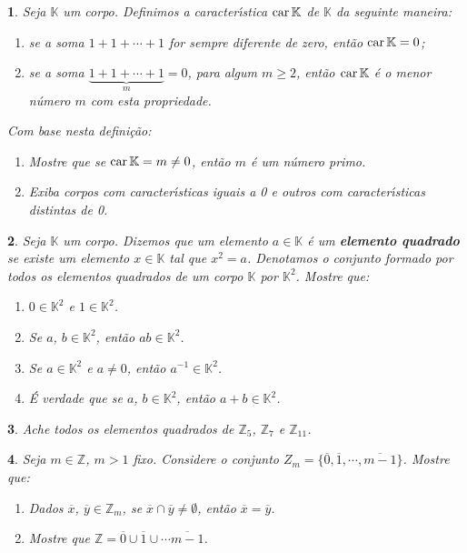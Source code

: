 \documentclass[12pt]{exam}
\newtheorem{exercicio}{}
\newcommand{\z}{\mathbb{Z}}
\newcommand{\cp}[1]{\mathbb{#1}}
\newcommand{\ch}{\mbox{\textrm{car\,}}\nobreak}
\begin{document}
\begin{exercicio}
Seja $\cp{K}$ um corpo. Definimos a caracter{\'\i}stica \textbf{$\ch \cp{K}$} de $\cp{K}$ da seguinte maneira:
\begin{enumerate}[label=({\roman*})]
  \item se a soma $1 + 1 + \cdots + 1$ for sempre diferente de zero, ent\~ao \textbf{$\ch \cp{K} = 0$};
  \item se a soma $\underbrace{1 + 1 + \cdots + 1}_{m} = 0$, para algum $m \ge 2$, ent\~ao \textbf{$\ch \cp{K}$} \'e o menor n\'umero $m$ com esta propriedade.
\end{enumerate}
Com base nesta defini\c{c}\~ao:
\begin{enumerate}[label={\alph*})]
  \item Mostre que se $\ch \cp{K} = m \ne 0$, ent\~ao $m$ \'e um n\'umero primo.
  \item Exiba corpos com caracter{\'\i}sticas iguais a 0 e outros com caracter{\'\i}sticas distintas de 0.
\end{enumerate}
\end{exercicio}

\begin{exercicio}
  Seja $\cp{K}$ um corpo. Dizemos que um elemento $a \in \cp{K}$ \'e um \textbf{elemento quadrado} se existe um elemento $x \in \cp{K}$ tal que $x^2 = a$. Denotamos o conjunto formado por todos os elementos quadrados de um corpo $\cp{K}$ por $\cp{K}^2$. Mostre que:
  \begin{enumerate}[label={\alph*})]
    \item $0 \in \cp{K}^2$ e $1 \in \cp{K}^2$.
    \item Se $a$, $b \in \cp{K}^2$, ent\~ao $ab \in \cp{K}^2$.
    \item Se $a \in \cp{K}^2$ e $a \ne 0$, ent\~ao $a^{-1} \in \cp{K}^2$.
    \item \'E verdade que se $a$, $b \in \cp{K}^2$, ent\~ao $a + b \in \cp{K}^2$.
  \end{enumerate}
\end{exercicio}

\begin{exercicio}
  Ache todos os elementos quadrados de $\z_5$, $\z_7$ e $\z_{11}$.
\end{exercicio}

\begin{exercicio}
  Seja $m \in \z$, $m > 1$ fixo. Considere o conjunto $Z_m = \{\overline{0}, \overline{1}, \cdots, \overline{m-1}\}$. Mostre que:
  \begin{enumerate}[label={\alph*})]
    \item Dados $\overline{x}$, $\overline{y} \in \z_m$, se $\overline{x} \cap \overline{y} \ne \emptyset$, ent\~ao $\overline{x} = \overline{y}$.
    \item Mostre que $\z = \overline{0} \cup \overline{1} \cup \cdots \overline{m-1}$.
  \end{enumerate}
\end{exercicio}

% 
\end{document}
